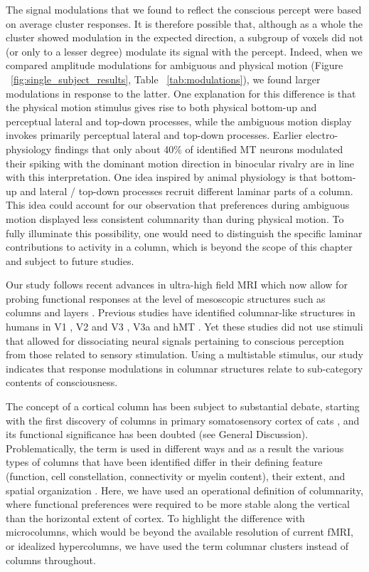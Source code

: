 The signal modulations that we found to reflect the conscious percept were based on average cluster responses. It is therefore possible that, although as a whole the cluster showed modulation in the expected direction, a subgroup of voxels did not (or only to a lesser degree) modulate its signal with the percept. Indeed, when we compared amplitude modulations for ambiguous and physical motion (Figure ~\ref{fig:single_subject_results}, Table ~\ref{tab:modulations}), we found larger modulations in response to the latter. One explanation for this difference is that the physical motion stimulus gives rise to both physical bottom-up and perceptual lateral and top-down processes, while the ambiguous motion display invokes primarily perceptual lateral and top-down processes. Earlier electro-physiology findings that only about 40\% of identified MT neurons modulated their spiking with the dominant motion direction in binocular rivalry \parencite{Logothetis1989} are in line with this interpretation. One idea inspired by animal physiology \parencite{Felleman1991, Markov2014} is that bottom-up and lateral / top-down processes recruit different laminar parts of a column. This idea could account for our observation that preferences during ambiguous motion displayed less consistent columnarity than during physical motion. To fully illuminate this possibility, one would need to distinguish the specific laminar contributions to activity in a column, which is beyond the scope of this chapter and subject to future studies.

Our study follows recent advances in ultra-high field MRI which now allow for probing functional responses at the level of mesoscopic structures such as columns and layers \parencite{Polimeni2017, DeMartino2016, Kemper2017}. Previous studies have identified columnar-like structures in humans in V1 \parencite{Cheng2001, Yacoub2008}, V2 and V3 \parencite{Nasr2016}, V3a \parencite{Goncalves2015} and hMT \parencite{Zimmermann2011}. Yet these studies did not use stimuli that allowed for dissociating neural signals pertaining to conscious perception from those related to sensory stimulation. Using a multistable stimulus, our study indicates that response modulations in columnar structures relate to sub-category contents of consciousness.

The concept of a cortical column has been subject to substantial debate, starting with the first discovery of columns in primary somatosensory cortex of cats \parencite{Mountcastle1956}, and its functional significance has been doubted (see General Discussion). Problematically, the term is used in different ways and as a result the various types of columns that have been identified differ in their defining feature (function, cell constellation, connectivity or myelin content), their extent, and spatial organization \parencite{Rakic2008}. Here, we have used an operational definition of columnarity, where functional preferences were required to be more stable along the vertical than the horizontal extent of cortex. To highlight the difference with microcolumns, which would be beyond the available resolution of current fMRI, or idealized hypercolumns, we have used the term columnar clusters instead of columns throughout.

